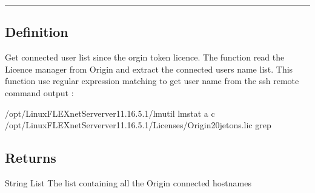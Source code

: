 \documentclass[letterpaper,10pt,english]{sphinxmanual}
\begin{document}
\bigskip\hrule\bigskip



\subsection{Definition}
\label{\detokenize{GUIFI/get_Connected:definition}}
\sphinxAtStartPar
Get connected user list since the orgin token licence.
The function read the Licence manager from Origin and extract the connected users name list.
This function use regular expression matching to get user name from the ssh remote command output :

\begin{sphinxVerbatim}[commandchars=\\\{\}]
/opt/Linux\PYGZus{}FLEXnet\PYGZus{}Server\PYGZus{}ver\PYGZus{}11.16.5.1/lmutil  lmstat \PYGZhy{}a \PYGZhy{}c /opt/Linux\PYGZus{}FLEXnet\PYGZus{}Server\PYGZus{}ver\PYGZus{}11.16.5.1/Licenses/Origin\PYGZus{}20jetons.lic  grep 
\end{sphinxVerbatim}


\subsection{Returns}
\label{\detokenize{GUIFI/get_Connected:returns}}
\sphinxAtStartPar
String List
The list containing all the Origin connected hostnames
\end{document}
